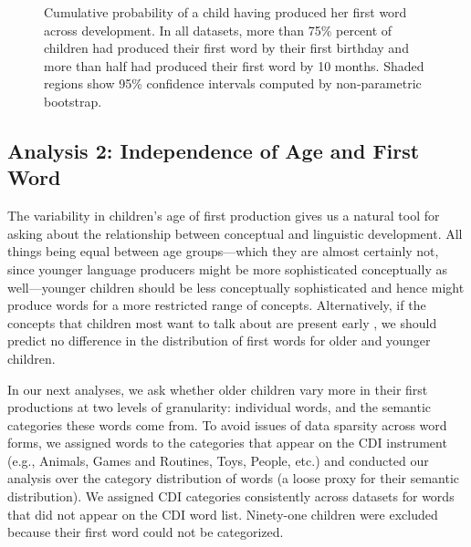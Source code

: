 \documentclass[10pt,letterpaper]{article}
\begin{document}
\begin{figure}[tb]
\caption{\label{fig:cdfs} Cumulative probability of a child having produced her first word across development. In all datasets, more than 75\% percent of children had produced their first word by their first birthday and more than half had produced their first word by 10 months. Shaded regions show 95\% confidence intervals computed by non-parametric bootstrap.}
\vspace{-2em}
\end{figure}


\subsection{Analysis 2: Independence of Age and First Word}

The variability in children's age of first production gives us a natural tool for asking about the relationship between conceptual and linguistic development. All things being equal between age groups---which they are almost certainly not, since younger language producers might be more sophisticated conceptually as well---younger children should be less conceptually sophisticated and hence might produce words for a more restricted range of concepts. Alternatively, if the concepts that children most want to talk about are present early \cite{snedeker2007,snedeker2012,gleitman1990}, we should predict no difference in the distribution of first words for older and younger children. 

In our next analyses, we ask whether older children vary more in their first productions at two levels of granularity: individual words, and the semantic categories these words come from.  To avoid issues of data sparsity across word forms, we assigned words to the categories that appear on the CDI instrument (e.g., Animals, Games and Routines, Toys, People, etc.) and conducted our analysis over the category distribution of words (a loose proxy for their semantic distribution). We assigned CDI categories consistently across datasets for words that did not appear on the CDI word list. Ninety-one children were excluded because their first word could not be categorized. 
\end{document}
